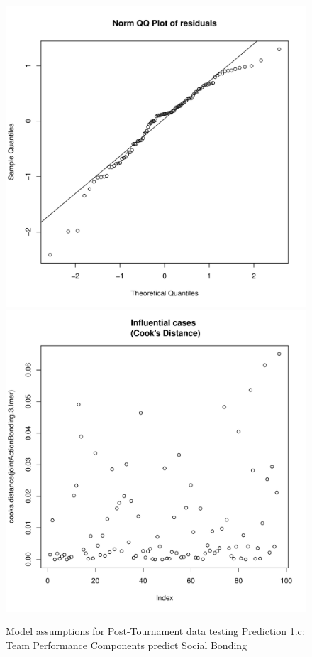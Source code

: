 \begin{CJK}{UTF8}{gbsn}
\begin{figure}[htbp]
              \includegraphics[scale =.4]{images/MLM3aQQNorm.pdf}
              \includegraphics[scale =.4]{images/MLM3aCooksD.pdf}
              \caption{Model assumptions for Post-Tournament data testing Prediction 1.c: Team Performance Components predict Social Bonding}
              \label{fig:MLM3aAssumptions}
            \end{figure}



\end{CJK}
